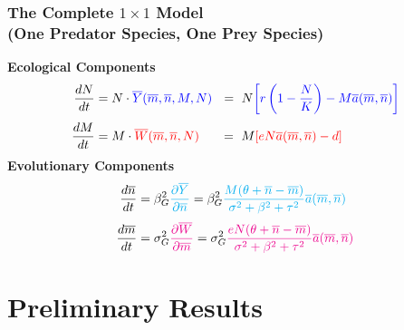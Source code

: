 \documentclass[10pt]{beamer}
\begin{document}
\begin{frame}
	\frametitle{The Complete $1\times1$ Model \\ (One Predator Species, One Prey Species)}
	{\bf Ecological Components}
	\begin{align*}
	\frac{dN}{dt} &= N\cdot {\color{blue}\overline{Y}(\overline{m}, \overline{n}, M, N)}\ \ =\ N{\color{blue}\left[r\left(1 - \frac{N}{K}\right) - M\overline{a}(\overline{m}, \overline{n})\right]}\\[.1cm]
	\frac{dM}{dt} &= M\cdot {\color{red}\overline{W}(\overline{m}, \overline{n}, N)}\ \ \ \ \ =\ M{\color{red}\left[eN\overline{a}(\overline{m}, \overline{n}) - d\right]}
	\end{align*}
	{\bf Evolutionary Components}
	\begin{align*}
	\frac{d\overline{n}}{dt} &= \beta_G^2{\color{cyan}\frac{\partial \overline{Y}}{\partial \overline{n}}} = \beta_G^2{\color{cyan}\frac{M(\theta + \overline{n} - \overline{m})}{\sigma^2 + \beta^2 + \tau^2} \overline{a}(\overline{m}, \overline{n})}\\[.1cm]
	\frac{d\overline{m}}{dt} &= \sigma_G^2{\color{magenta}\frac{\partial \overline{W}}{\partial \overline{m}}} = \sigma_G^2{\color{magenta}\frac{eN(\theta + \overline{n} - \overline{m})}{\sigma^2 + \beta^2 + \tau^2} \overline{a}(\overline{m}, \overline{n})}
	\end{align*}
\end{frame}

\section{Preliminary Results}
\end{document}
